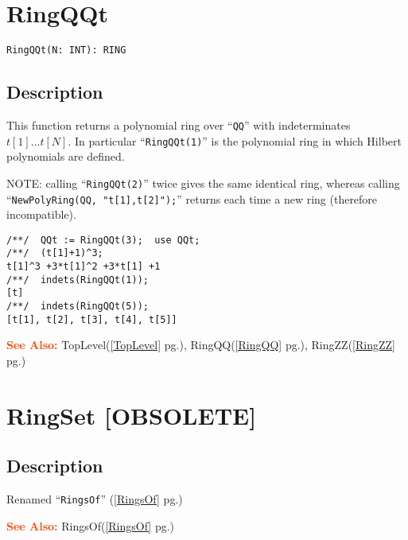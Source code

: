 \documentclass[a4paper]{mybook}
\newenvironment{command}{}{} %
\newcommand\SeeAlso{\par\textcolor{OrangeRed}{\textbf{\large See Also: }}}
\begin{document}
\section{RingQQt}
\label{RingQQt}
\begin{command} %


\begin{Verbatim}[label=syntax, rulecolor=\color{MidnightBlue},
frame=single]
RingQQt(N: INT): RING
\end{Verbatim}


\subsection*{Description}

This function returns a polynomial ring over ``\verb&QQ&'' with indeterminates $t[1]...t[N]$.
In particular ``\verb&RingQQt(1)&'' is the polynomial ring in which Hilbert
polynomials are defined.
\par 
NOTE: calling ``\verb&RingQQt(2)&'' twice gives the same identical ring,
whereas calling ``\verb&NewPolyRing(QQ, "t[1],t[2]");&''
returns each time a new ring (therefore incompatible).
\begin{Verbatim}[label=example, rulecolor=\color{PineGreen}, frame=single]
/**/  QQt := RingQQt(3);  use QQt;
/**/  (t[1]+1)^3;
t[1]^3 +3*t[1]^2 +3*t[1] +1
/**/  indets(RingQQt(1));
[t]
/**/  indets(RingQQt(5));
[t[1], t[2], t[3], t[4], t[5]]
\end{Verbatim}


\SeeAlso %
  TopLevel(\ref{TopLevel} pg.\pageref{TopLevel}), 
    RingQQ(\ref{RingQQ} pg.\pageref{RingQQ}), 
    RingZZ(\ref{RingZZ} pg.\pageref{RingZZ})
\end{command} %

\section{RingSet [OBSOLETE]}
\label{RingSet [OBSOLETE]}
\begin{command} %



\subsection*{Description}

Renamed ``\verb&RingsOf&'' (\ref{RingsOf} pg.\pageref{RingsOf})

\SeeAlso %
  RingsOf(\ref{RingsOf} pg.\pageref{RingsOf})
\end{command} %
\end{document}
